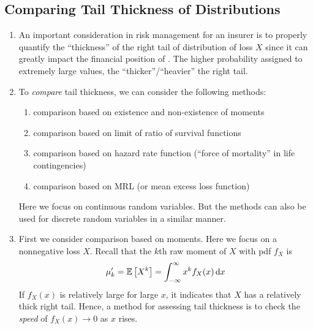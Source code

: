 \subsection{Comparing Tail Thickness of Distributions}
\begin{enumerate}
\item An important consideration in risk management for an insurer
 is to properly quantify the ``thickness'' of the right tail
of distribution of loss \(X\) since it can greatly impact the financial
position of . The higher probability assigned to extremely
large values, the ``thicker''/``heavier'' the right tail.

\begin{center}
\end{center}
\item To \emph{compare} tail thickness, we can consider the following methods:
\begin{enumerate}
\item comparison based on existence and non-existence of moments
\item comparison based on limit of ratio of survival functions
\item comparison based on hazard rate function (``force of mortality'' in life contingencies)
\item comparison based on MRL (or mean excess loss function)
\end{enumerate}
\begin{note}
Here we focus on continuous random variables. But the methods can also be used
for discrete random variables in a similar manner.
\end{note}
\item First we consider comparison based on moments. Here we focus on a
nonnegative loss \(X\). Recall that the \(k\)th raw moment of \(X\) with pdf
\(f_X\) is
\[
\mu_k'=\mathbb{E}\left[X^k\right]=\int_{-\infty}^{\infty}x^kf_X(x)\dd{x}
\]
If \(f_X(x)\) is relatively large for large \(x\), it indicates that \(X\) has
a relatively thick right tail. Hence, a method for assessing tail thickness is
to check the \emph{speed} of \(f_X(x)\to 0\) as \(x\) rises.


\end{enumerate}
